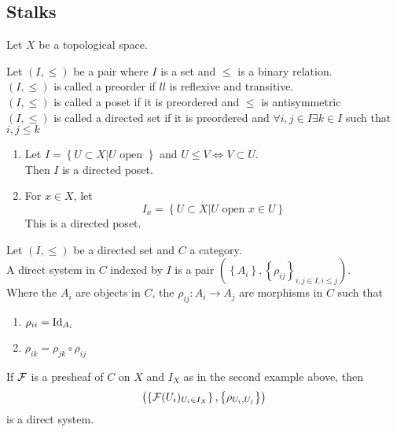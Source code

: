 \documentclass[../main.tex]{subfiles}
\begin{document}
\subsection{Stalks}
Let $X$ be a topological space.
\begin{defn}
	Let $( I, \leq  ) $ be a pair where $I$ is a set and $ \leq $ is a binary relation.\\
	$( I, \leq ) $ is called a preorder if $ll$ is reflexive and transitive.\\
	$( I, \leq ) $ is called a poset if it is preordered and $ \leq $ is antisymmetric\\
	$( I, \leq ) $ is called a directed set if it is preordered and $\forall i,j \in I \exists k \in I$ such that $i, j \leq k$ 
\end{defn}
\begin{exemple}
\begin{enumerate}
\item Let $I= \left\{ U \subset X | U \text{ open }  \right\} $ and $U \leq V \iff V \subset U$.\\
	Then $I $ is a directed poset.
\item For $x\in X$, let
	\[ 
	I_x = \left\{ U \subset X| U \text{ open } x\in U \right\} 
	\]
	This is a directed poset.
\end{enumerate}
\end{exemple}
\begin{defn}
	Let $( I, \leq ) $ be a directed set and $C$ a category.\\
	A direct system in $C$ indexed by $I$ is a pair $\left(  \left\{ A_i \right\}, \left\{ \rho_{ij}  \right\}_{i,j \in I, i \leq j}   \right)$.\\
	Where the $A_i$ are objects in $C$, the $\rho_{ij} : A_i \to A_j$ are morphisms in $C$ such that
	\begin{enumerate}
	\item $\rho_{ii} = \operatorname{Id}_{A_i} $ 
	\item $\rho_{ik} = \rho_{j k}\circ \rho_{i j}  $ 
	\end{enumerate}
\end{defn}
\begin{exemple}
If $\mathcal{F}$ is a presheaf of $C$ on $X$ and $I_X$ as in the second example above, then
\[ 
	\left( \left\{ \mathcal{F}( U_i) _{U_i \in I_X}\right\} , \left\{ \rho_{U_i, U_j} \right\}   \right) 
\]
is a direct system.
\end{exemple}
\end{document}
